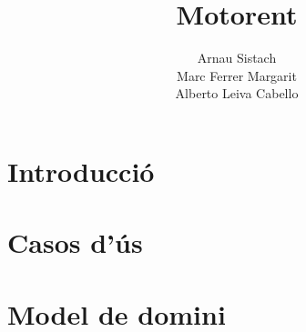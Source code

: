 \documentclass{article}
\title{Motorent}
\author{Arnau Sistach\\Marc Ferrer Margarit \\ Alberto Leiva Cabello}
\begin{document}
\maketitle
\tableofcontents


\section{Introducci\'o}
\section{Casos d'\'us}
\section{Model de domini}
\end{document}

